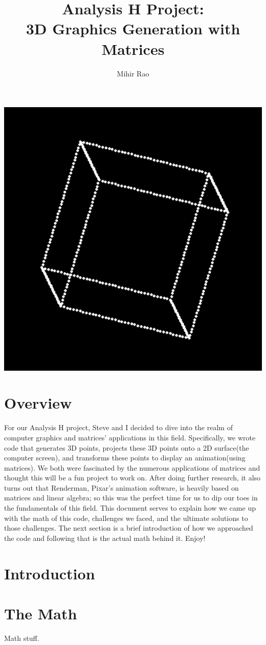 \documentclass[14pt]{article}
\begin{document}
\title{Analysis H Project: \\ \textbf{3D Graphics Generation with Matrices}}
\author{Mihir Rao}
\maketitle

\begin{center}
	\vspace{3em}
	\includegraphics[scale=0.8]{titleImg}
	\vspace{3em}
\end{center}

\section*{Overview}

For our Analysis H project, Steve and I decided to dive into the realm of computer graphics and matrices' applications in this field. Specifically, we wrote code that generates 3D points, projects these 3D points onto a 2D surface(the computer screen), and transforms these points to display an animation(using matrices). We both were fascinated by the numerous applications of matrices and thought this will be a fun project to work on. After doing further research, it also turns out that Renderman, Pixar's animation software, is heavily based on matrices and linear algebra; so this was the perfect time for us to dip our toes in the fundamentals of this field. This document serves to explain how we came up with the math of this code, challenges we faced, and the ultimate solutions to those challenges. The next section is a brief introduction of how we approached the code and following that is the actual math behind it. Enjoy!

\newpage

\section*{Introduction}



\section*{The Math}

Math stuff.
\end{document}
